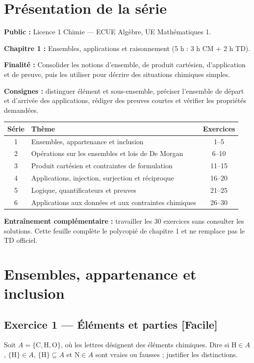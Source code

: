 \documentclass[11pt,a4paper,oneside]{article}
\newcommand{\exo}[3]{%
  \Needspace{6\baselineskip}%
  \subsection*{Exercice #1 --- #3 \hfill
  {\normalfont\footnotesize\color{GrisTexte}[#2]}}}
\begin{document}
\section*{Présentation de la série}
\begin{objectifbox}
\textbf{Public :} Licence 1 Chimie --- ECUE Algèbre, UE Mathématiques 1.\par
\textbf{Chapitre 1 :} Ensembles, applications et raisonnement (5 h : 3 h CM + 2 h TD).\par
\textbf{Finalité :} Consolider les notions d'ensemble, de produit cartésien, d'application et de preuve, puis les utiliser pour décrire des situations chimiques simples.\par
\textbf{Consignes :} distinguer élément et sous-ensemble, préciser l'ensemble de départ et d'arrivée des applications, rédiger des preuves courtes et vérifier les propriétés demandées.
\end{objectifbox}
\begin{center}\begin{tabularx}{\textwidth}{@{}cXc@{}}\toprule
\textbf{Série} & \textbf{Thème} & \textbf{Exercices}\\\midrule
1 & Ensembles, appartenance et inclusion & 1--5\\
2 & Opérations sur les ensembles et lois de De Morgan & 6--10\\
3 & Produit cartésien et contraintes de formulation & 11--15\\
4 & Applications, injection, surjection et réciproque & 16--20\\
5 & Logique, quantificateurs et preuves & 21--25\\
6 & Applications aux données et aux contraintes chimiques & 26--30\\
\bottomrule\end{tabularx}\end{center}
\begin{conseilbox}\textbf{Entraînement complémentaire :} travailler les 30 exercices sans consulter les solutions. Cette feuille complète le polycopié de chapitre 1 et ne remplace pas le TD officiel.\end{conseilbox}
\setcounter{tocdepth}{1}\tableofcontents
\section{Ensembles, appartenance et inclusion}

\exo{1}{Facile}{Éléments et parties}
Soit $A=\{\mathrm C,\mathrm H,\mathrm O\}$, où les lettres désignent des éléments chimiques.
Dire si $\mathrm H\in A$, $\{\mathrm H\}\in A$, $\{\mathrm H\}\subseteq A$ et $\mathrm N\in A$ sont vraies ou fausses ; justifier les distinctions.
\end{document}
